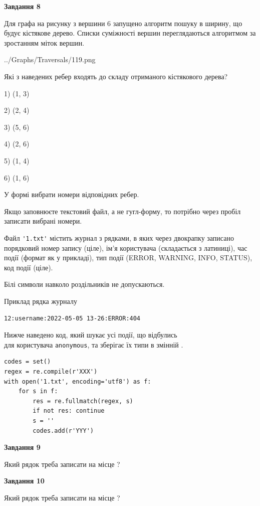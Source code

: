 \documentclass[12pt, ukrainian]{article}
\def\code#1{\Verb!#1!}
\begin{document}
{\begin {large}
{\begin {center}\textbf{Завдання 8}\end {center}}\par
Для графа на рисунку з вершини 6 запущено алгоритм пошуку в ширину, що будує кістякове дерево. Списки суміжності вершин переглядаються алгоритмом за зростанням міток вершин.\par
\begin{center}
	{../Graphs/Traversals/119.png}
\end{center}
\par Які з наведених ребер входять до складу отриманого кістякового дерева?\par
1) (1, 3)\par
2) (2, 4)\par
3) (5, 6)\par
4) (2, 6)\par
5) (1, 4)\par
6) (1, 6)\par
{\vskip 15pt} У формі вибрати номери відповідних ребер.


Якщо заповнюєте текстовий файл, а не гугл-форму, то потрібно через пробіл записа\-ти вибрані номери.\par
\newpage


Файл \code{'1.txt'} містить журнал з рядками, в яких через двокрапку записано поряд\-ко\-вий номер запису (ціле), ім'я користувача (складається з латиниці), час події (фор\-мат як у прикладі), тип події (ERROR, WARNING, INFO, STATUS), код події (ціле).

Білі символи навколо роздільників не допускаються.

Приклад рядка журналу



\begin{verbatim}
12:username:2022-05-05 13-26:ERROR:404
\end{verbatim}


Нижче наведено код, який шукає усі події, що відбулись\\ для користувача \code{anonymous}, та зберігає їх типи в змінній .



\begin{verbatim}
codes = set()
regex = re.compile(r'XXX')
with open('1.txt', encoding='utf8') as f:
    for s in f:
        res = re.fullmatch(regex, s)
        if not res: continue
        s = ''
        codes.add(r'YYY')
\end{verbatim}


{\begin {center}\textbf{Завдання 9}\end {center}}\par
Який рядок треба записати на місце  ?\par
\vspace{5mm}


{\begin {center}\textbf{Завдання 10}\end {center}}\par
Який рядок треба записати на місце  ?\par


\newpage


\end {large}}
\end{document}
